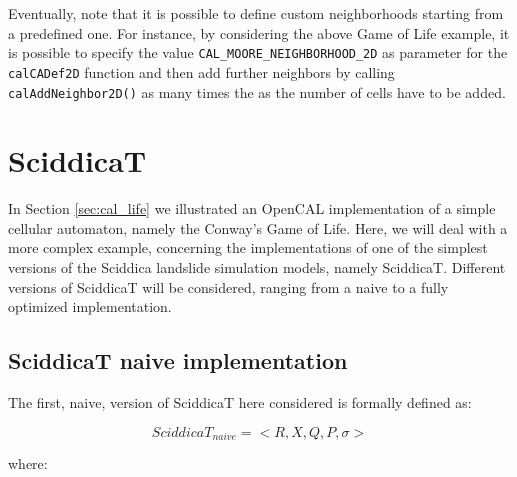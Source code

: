 Eventually, note that it is possible to define custom neighborhoods
starting from a predefined one. For instance, by considering the above
Game of Life example, it is possible to specify the value
\verb'CAL_MOORE_NEIGHBORHOOD_2D' as parameter for the
\verb'calCADef2D' function and then add further neighbors by calling
\verb'calAddNeighbor2D()' as many times the as the number of cells
have to be added.

\section{SciddicaT}\label{sec:sciddicaT}
In Section \ref{sec:cal_life} we illustrated an OpenCAL implementation
of a simple cellular automaton, namely the Conway’s Game of
Life. Here, we will deal with a more complex example, concerning the
implementations of one of the simplest versions of the Sciddica
landslide simulation models, namely SciddicaT. Different versions of
SciddicaT will be considered, ranging from a naive to a fully
optimized implementation.


\subsection{SciddicaT naive implementation}

The first, naive, version of SciddicaT here considered is formally
defined as:

$$SciddicaT_{naive} = < R, X, Q , P, \sigma  >$$

where:

